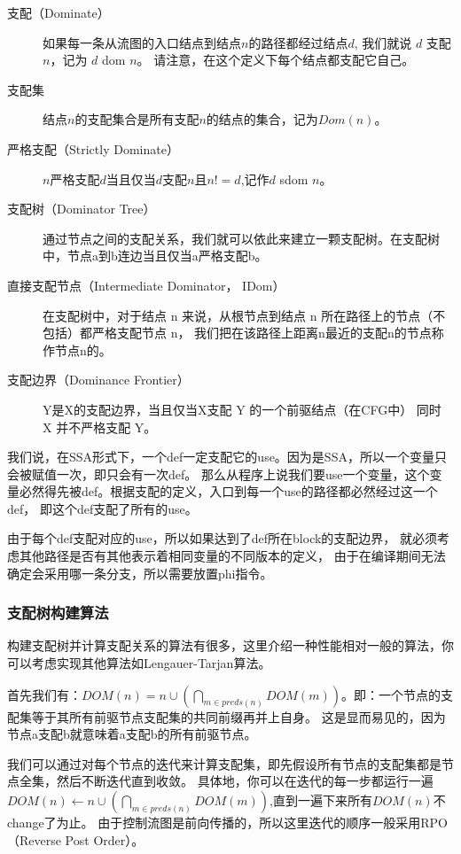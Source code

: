\begin{description}
    \item[支配（Dominate）] 
    如果每一条从流图的入口结点到结点$n$的路径都经过结点$d$, 我们就说 $d$ 支配 $n$，记为 $d$ dom $n$。
    请注意，在这个定义下每个结点都支配它自己。
    \item[支配集]
    结点$n$的支配集合是所有支配$n$的结点的集合，记为$Dom(n)$。
    \item[严格支配（Strictly Dominate）]
    $n$严格支配$d$当且仅当$d$支配$n$且$n!=d$,记作$d$ sdom $n$。
       
    \item[支配树（Dominator Tree）]
    通过节点之间的支配关系，我们就可以依此来建立一颗支配树。在支配树中，节点a到b连边当且仅当a严格支配b。

    \item[直接支配节点（Intermediate Dominator， IDom）] 
    在支配树中，对于结点 n 来说，从根节点到结点 n 所在路径上的节点（不包括）都严格支配节点 n，
    我们把在该路径上距离n最近的支配n的节点称作节点n的。
    \item[支配边界（Dominance Frontier）]
    Y是X的支配边界，当且仅当X支配 Y 的一个前驱结点（在CFG中）
    同时 X 并不严格支配 Y。
\end{description}

我们说，在SSA形式下，一个def一定支配它的use。因为是SSA，所以一个变量只会被赋值一次，即只会有一次def。
那么从程序上说我们要use一个变量，这个变量必然得先被def。根据支配的定义，入口到每一个use的路径都必然经过这一个def，
即这个def支配了所有的use。

由于每个def支配对应的use，所以如果达到了def所在block的支配边界，
就必须考虑其他路径是否有其他表示着相同变量的不同版本的定义，
由于在编译期间无法确定会采用哪一条分支，所以需要放置phi指令。

\subsubsection{支配树构建算法}
构建支配树并计算支配关系的算法有很多，这里介绍一种性能相对一般的算法，你可以考虑实现其他算法如Lengauer-Tarjan算法。

首先我们有：$DOM(n)={n}\cup(\bigcap_{m\in preds(n)}DOM(m))$。即：一个节点的支配集等于其所有前驱节点支配集的共同前缀再并上自身。
这是显而易见的，因为节点a支配b就意味着a支配b的所有前驱节点。

我们可以通过对每个节点的迭代来计算支配集，即先假设所有节点的支配集都是节点全集，然后不断迭代直到收敛。
具体地，你可以在迭代的每一步都运行一遍$DOM(n)\leftarrow{n}\cup(\bigcap_{m\in preds(n)}DOM(m))$,直到一遍下来所有$DOM(n)$不change了为止。
由于控制流图是前向传播的，所以这里迭代的顺序一般采用RPO（Reverse Post Order）。

